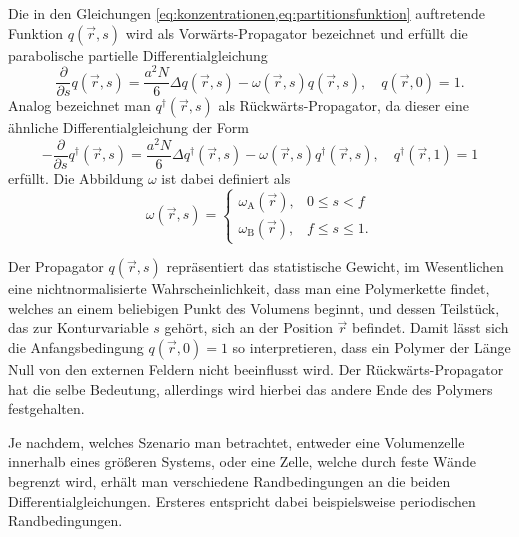 Die in den Gleichungen \cref{eq:konzentrationen,eq:partitionsfunktion} auftretende Funktion $q(\vec{r}, s)$ wird als Vorwärts-Propagator bezeichnet und erfüllt die parabolische partielle Differentialgleichung
\begin{equation}
\label{eq:forward_propagator}
        \frac{\partial}{\partial s} q(\vec{r}, s) = \frac{a^{2}N}{6} \Delta q(\vec{r}, s) - \omega(\vec{r}, s) q(\vec{r}, s), \quad
        q(\vec{r}, 0) = 1.
\end{equation}
Analog bezeichnet man $q^{\dagger}(\vec{r}, s)$ als Rückwärts-Propagator, da dieser eine ähnliche Differentialgleichung der Form
\begin{equation}
\label{eq:backward_propagator}
        -\frac{\partial}{\partial s}q^{\dagger}(\vec{r}, s) = \frac{a^{2}N}{6} \Delta q^{\dagger}(\vec{r}, s) - \omega(\vec{r}, s) q^{\dagger}(\vec{r}, s), \quad
        q^{\dagger}(\vec{r}, 1) = 1
\end{equation}%
erfüllt.
Die Abbildung $\omega$ ist dabei definiert als
\begin{equation}
    \omega(\vec{r}, s) = \begin{cases}
        \omega_{\mathrm{A}}(\vec{r}), & 0 \leq s < f\\
        \omega_{\mathrm{B}}(\vec{r}), & f \leq s \leq 1.
    \end{cases}
\end{equation}

Der Propagator $q(\vec{r}, s)$ repräsentiert das statistische Gewicht, im Wesentlichen eine nichtnormalisierte Wahrscheinlichkeit, dass man eine Polymerkette findet, welches an einem beliebigen Punkt des Volumens beginnt, und dessen Teilstück, das zur Konturvariable $s$ gehört, sich an der Position $\vec{r}$ befindet.
Damit lässt sich die Anfangsbedingung $q(\vec r, 0) = 1$ so interpretieren, dass ein Polymer der Länge Null von den externen Feldern nicht beeinflusst wird.
Der Rückwärts-Propagator hat die selbe Bedeutung, allerdings wird hierbei das andere Ende des Polymers festgehalten.

Je nachdem, welches Szenario man betrachtet, entweder eine Volumenzelle innerhalb eines größeren Systems, oder eine Zelle, welche durch feste Wände begrenzt wird, erhält man verschiedene Randbedingungen an die beiden Differentialgleichungen.
Ersteres entspricht dabei beispielsweise periodischen Randbedingungen.

